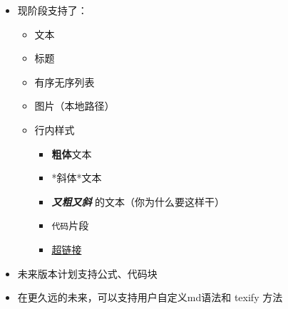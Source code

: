 \documentclass{ctexart}
\begin{document}
	\begin{itemize}
		\item 现阶段支持了：
		\begin{itemize}
			\item 文本
			\item 标题
			\item 有序无序列表
			\item 图片（本地路径）
			\item 行内样式
			\begin{itemize}
				\item \textbf{粗体}文本
				\item *斜体*文本
				\item \textbf{\textit{又粗又斜}} 的文本（你为什么要这样干）
				\item \texttt{代码}片段
				\item \href{https://http.cat/404}{超链接}
			\end{itemize}
		\end{itemize}
		\item 未来版本计划支持公式、代码块
		\item 在更久远的未来，可以支持用户自定义md语法和 texify 方法
	\end{itemize}
\end{document}
